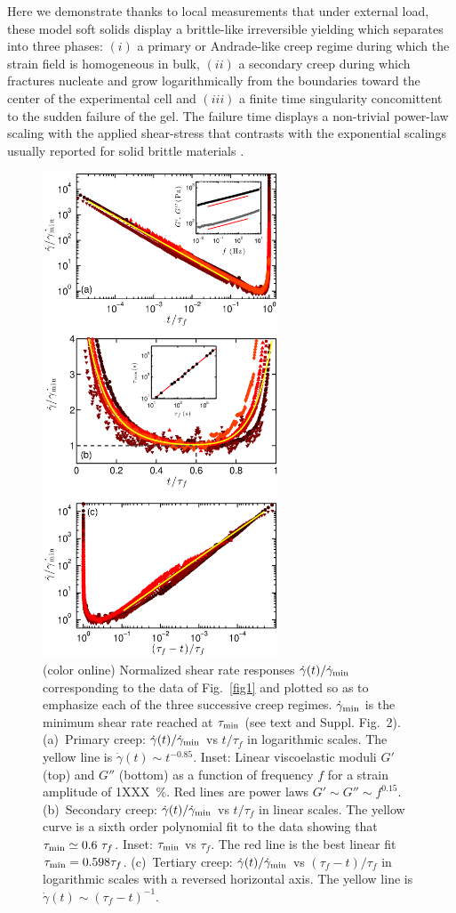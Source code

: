 \documentclass[twocolumn,superscriptaddress,showpacs,preprintnumbers,amsmath,amssymb,prl]{revtex4}
\newcommand\gp{\dot\gamma}
\newcommand\gpm{\dot\gamma_{\rm min}}
\newcommand\taum{\tau_{\rm min}}
\begin{document}
Here we demonstrate thanks to local measurements that under external load, these model soft solids display a brittle-like irreversible yielding which separates into three phases: $(i)$ a primary or Andrade-like creep regime during which the strain field is homogeneous in bulk, $(ii)$ a secondary creep during which fractures nucleate and grow logarithmically from the boundaries toward the center of the experimental cell and $(iii)$ a finite time singularity concomittent to the sudden failure of the gel. The failure time displays a non-trivial power-law scaling with the applied shear-stress that contrasts with the exponential scalings usually reported for solid brittle materials \cite{Vanel:2009}.


\begin{figure}
\centering
\includegraphics[width=7cm,clip]{Fig2.eps}
\caption{(color online) Normalized shear rate responses $\gp(t)/\gpm$ corresponding to the data of Fig.~\ref{fig1} and plotted so as to emphasize each of the three successive creep regimes. $\gpm$ is the minimum shear rate reached at $\taum$ (see text and Suppl. Fig.~2). (a)~Primary creep: $\gp(t)/\gpm$ vs $t/\tau_f$ in logarithmic scales. The yellow line is $\gp(t)\sim t^{-0.85}$. Inset: Linear viscoelastic moduli $G'$ (top) and $G''$ (bottom) as a function of frequency $f$ for a strain amplitude of 1XXX~\%. Red lines are power laws $G'\sim G''\sim f^{0.15}$. (b)~Secondary creep: $\gp(t)/\gpm$ vs $t/\tau_f$ in linear scales. The yellow curve is a sixth order polynomial fit to the data showing that $\taum\simeq 0.6~\tau_f$. Inset: $\taum$ vs $\tau_f$. The red line is the best linear fit $\taum=0.598\tau_f$. (c)~Tertiary creep: $\gp(t)/\gpm$ vs $(\tau_f-t)/\tau_f$ in logarithmic scales with a reversed horizontal axis. The yellow line is $\gp(t)\sim (\tau_f-t)^{-1}$. 
\label{fig2}}
\end{figure} 
\end{document}
